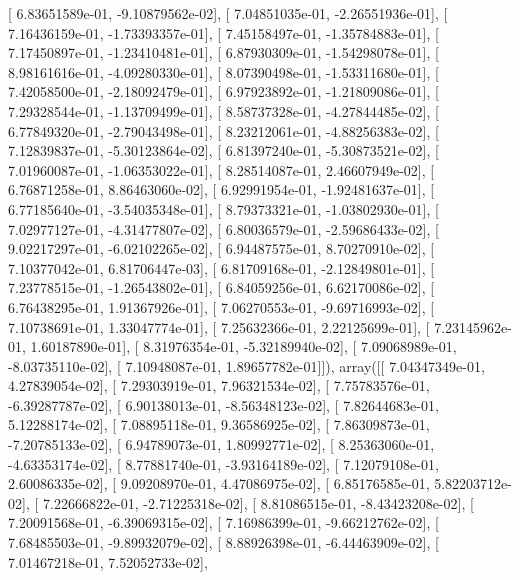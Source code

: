 \documentclass{article}
\begin{document}
       [  6.83651589e-01,  -9.10879562e-02],
       [  7.04851035e-01,  -2.26551936e-01],
       [  7.16436159e-01,  -1.73393357e-01],
       [  7.45158497e-01,  -1.35784883e-01],
       [  7.17450897e-01,  -1.23410481e-01],
       [  6.87930309e-01,  -1.54298078e-01],
       [  8.98161616e-01,  -4.09280330e-01],
       [  8.07390498e-01,  -1.53311680e-01],
       [  7.42058500e-01,  -2.18092479e-01],
       [  6.97923892e-01,  -1.21809086e-01],
       [  7.29328544e-01,  -1.13709499e-01],
       [  8.58737328e-01,  -4.27844485e-02],
       [  6.77849320e-01,  -2.79043498e-01],
       [  8.23212061e-01,  -4.88256383e-02],
       [  7.12839837e-01,  -5.30123864e-02],
       [  6.81397240e-01,  -5.30873521e-02],
       [  7.01960087e-01,  -1.06353022e-01],
       [  8.28514087e-01,   2.46607949e-02],
       [  6.76871258e-01,   8.86463060e-02],
       [  6.92991954e-01,  -1.92481637e-01],
       [  6.77185640e-01,  -3.54035348e-01],
       [  8.79373321e-01,  -1.03802930e-01],
       [  7.02977127e-01,  -4.31477807e-02],
       [  6.80036579e-01,  -2.59686433e-02],
       [  9.02217297e-01,  -6.02102265e-02],
       [  6.94487575e-01,   8.70270910e-02],
       [  7.10377042e-01,   6.81706447e-03],
       [  6.81709168e-01,  -2.12849801e-01],
       [  7.23778515e-01,  -1.26543802e-01],
       [  6.84059256e-01,   6.62170086e-02],
       [  6.76438295e-01,   1.91367926e-01],
       [  7.06270553e-01,  -9.69716993e-02],
       [  7.10738691e-01,   1.33047774e-01],
       [  7.25632366e-01,   2.22125699e-01],
       [  7.23145962e-01,   1.60187890e-01],
       [  8.31976354e-01,  -5.32189940e-02],
       [  7.09068989e-01,  -8.03735110e-02],
       [  7.10948087e-01,   1.89657782e-01]]), array([[  7.04347349e-01,   4.27839054e-02],
       [  7.29303919e-01,   7.96321534e-02],
       [  7.75783576e-01,  -6.39287787e-02],
       [  6.90138013e-01,  -8.56348123e-02],
       [  7.82644683e-01,   5.12288174e-02],
       [  7.08895118e-01,   9.36586925e-02],
       [  7.86309873e-01,  -7.20785133e-02],
       [  6.94789073e-01,   1.80992771e-02],
       [  8.25363060e-01,  -4.63353174e-02],
       [  8.77881740e-01,  -3.93164189e-02],
       [  7.12079108e-01,   2.60086335e-02],
       [  9.09208970e-01,   4.47086975e-02],
       [  6.85176585e-01,   5.82203712e-02],
       [  7.22666822e-01,  -2.71225318e-02],
       [  8.81086515e-01,  -8.43423208e-02],
       [  7.20091568e-01,  -6.39069315e-02],
       [  7.16986399e-01,  -9.66212762e-02],
       [  7.68485503e-01,  -9.89932079e-02],
       [  8.88926398e-01,  -6.44463909e-02],
       [  7.01467218e-01,   7.52052733e-02],
\end{document}
